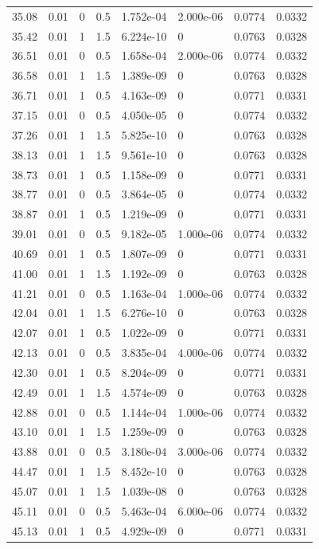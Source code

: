 \documentclass[preview]{standalone}
\begin{document}
{{{\begin{tabular}{L{1.2cm}C{1.2cm} C{0.3cm}C{0.5cm} C{1.4cm}C{1.4cm} C{1.4cm}C{1.4cm}}
  35.08  &  0.01  & 0     & 0.5 &  1.752e-04  & 2.000e-06  & 0.0774 &  0.0332   \\ 
  35.42  &  0.01  & 1     & 1.5 &  6.224e-10  & 0  & 0.0763 &  0.0328   \\ 
  36.51  &  0.01  & 0     & 0.5 &  1.658e-04  & 2.000e-06  & 0.0774 &  0.0332   \\ 
  36.58  &  0.01  & 1     & 1.5 &  1.389e-09  & 0  & 0.0763 &  0.0328   \\ 
  36.71  &  0.01  & 1     & 0.5 &  4.163e-09  & 0  & 0.0771 &  0.0331   \\ 
  37.15  &  0.01  & 0     & 0.5 &  4.050e-05  & 0  & 0.0774 &  0.0332   \\ 
  37.26  &  0.01  & 1     & 1.5 &  5.825e-10  & 0  & 0.0763 &  0.0328   \\ 
  38.13  &  0.01  & 1     & 1.5 &  9.561e-10  & 0  & 0.0763 &  0.0328   \\ 
  38.73  &  0.01  & 1     & 0.5 &  1.158e-09  & 0  & 0.0771 &  0.0331   \\ 
  38.77  &  0.01  & 0     & 0.5 &  3.864e-05  & 0  & 0.0774 &  0.0332   \\ 
  38.87  &  0.01  & 1     & 0.5 &  1.219e-09  & 0  & 0.0771 &  0.0331   \\ 
  39.01  &  0.01  & 0     & 0.5 &  9.182e-05  & 1.000e-06  & 0.0774 &  0.0332   \\ 
  40.69  &  0.01  & 1     & 0.5 &  1.807e-09  & 0  & 0.0771 &  0.0331   \\ 
  41.00  &  0.01  & 1     & 1.5 &  1.192e-09  & 0  & 0.0763 &  0.0328   \\ 
  41.21  &  0.01  & 0     & 0.5 &  1.163e-04  & 1.000e-06  & 0.0774 &  0.0332   \\ 
  42.04  &  0.01  & 1     & 1.5 &  6.276e-10  & 0  & 0.0763 &  0.0328   \\ 
  42.07  &  0.01  & 1     & 0.5 &  1.022e-09  & 0  & 0.0771 &  0.0331   \\ 
  42.13  &  0.01  & 0     & 0.5 &  3.835e-04  & 4.000e-06  & 0.0774 &  0.0332   \\ 
  42.30  &  0.01  & 1     & 0.5 &  8.204e-09  & 0  & 0.0771 &  0.0331   \\ 
  42.49  &  0.01  & 1     & 1.5 &  4.574e-09  & 0  & 0.0763 &  0.0328   \\ 
  42.88  &  0.01  & 0     & 0.5 &  1.144e-04  & 1.000e-06  & 0.0774 &  0.0332   \\ 
  43.10  &  0.01  & 1     & 1.5 &  1.259e-09  & 0  & 0.0763 &  0.0328   \\ 
  43.88  &  0.01  & 0     & 0.5 &  3.180e-04  & 3.000e-06  & 0.0774 &  0.0332   \\ 
  44.47  &  0.01  & 1     & 1.5 &  8.452e-10  & 0  & 0.0763 &  0.0328   \\ 
  45.07  &  0.01  & 1     & 1.5 &  1.039e-08  & 0  & 0.0763 &  0.0328   \\ 
  45.11  &  0.01  & 0     & 0.5 &  5.463e-04  & 6.000e-06  & 0.0774 &  0.0332   \\ 
  45.13  &  0.01  & 1     & 0.5 &  4.929e-09  & 0  & 0.0771 &  0.0331   \\ 
\hline 
\end{tabular} 

}}}
\end{document}
